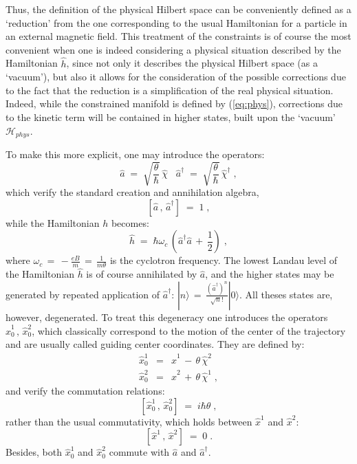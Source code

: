 \documentclass[a4paper,12pt]{article}
\begin{document}
Thus, the definition of the physical Hilbert space can be
conveniently
defined as a `reduction' from the one corresponding to the usual
Hamiltonian for a particle in an external magnetic field. This
treatment of the constraints is of course the most convenient when
one
is indeed considering a physical situation described by the
Hamiltonian ${\hat h}$, since not only it describes the physical
Hilbert space (as a `vacuum'), but also it allows for the
consideration of the possible corrections due to the fact that the
reduction is a simplification of the real physical situation.
Indeed,
while the constrained manifold is defined by (\ref{eq:phys}),
corrections due to the kinetic term will be contained in higher
states, built upon the `vacuum' ${\mathcal H}_{phys}$.

To make this more explicit, one may introduce the operators:
\begin{equation}
  \label{eq:defaad}
{\hat a} \;=\; \sqrt{\frac{\theta}{\hbar}} \, {\hat \chi} \;\;\;
{\hat a}^\dagger  \;=\; \sqrt{\frac{\theta}{\hbar}} \, {\hat
\chi}^\dagger \;,
\end{equation}
which verify the standard creation and annihilation algebra,
\begin{equation}
  \label{eq:caa}
[ {\hat a}\,,\, {\hat a}^\dagger ] \;=\; 1 \;,
\end{equation}
while the Hamiltonian $h$ becomes:
\begin{equation}
  \label{eq:hada}
{\hat h} \;=\; \hbar \omega_c \, ( {\hat a}^\dagger {\hat a} \,+\,
\frac{1}{2} ) \;, 
\end{equation}
where $\omega_c \,=\,- \frac{e B}{m}\,=\,\frac{1}{m \theta}$ is the
cyclotron
frequency.  The lowest Landau level of the Hamiltonian ${\hat h}$
is
of course annihilated by ${\hat a}$, and the higher states may be
generated by repeated application of ${\hat a}^\dagger$: $|n\rangle
\,=\,
\frac{({\hat a}^\dagger)^n}{\sqrt n!} |0\rangle $.  All theses
states are,
however, degenerated. To treat this degeneracy one introduces the
operators ${\hat x}^1_0\,,\,{\hat x}^2_0$, which classically
correspond to the motion of the center of the trajectory and are
usually called guiding center coordinates. They are defined by:
\begin{eqnarray}
  \label{eq:def0}
{\hat x}^1_0 &=& {\hat x}^1 \,-\, \theta \, {\hat \chi}^2
\nonumber\\
{\hat x}^2_0 &=& {\hat x}^2 \,+\, \theta \, {\hat \chi}^1 \;,
\end{eqnarray} 
and verify the commutation relations:
\begin{equation}
  \label{eq:cr0}
[ {\hat x}^1_0 \,,\, {\hat x}^2_0 ] \;=\; i \hbar \theta \;, 
\end{equation}
rather than the usual commutativity, which holds between ${\hat
x}^1$
and ${\hat x}^2$:
\begin{equation}
  \label{eq:cr1}
[ {\hat x}^1 \,,\, {\hat x}^2 ] \;=\; 0 \;. 
\end{equation}
Besides, both ${\hat x}^1_0$ and ${\hat x}^2_0$ commute with ${\hat
  a}$ and ${\hat a}^\dagger$.
\end{document}
